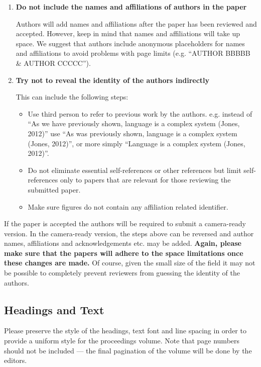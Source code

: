 \documentclass{evolang11}
\begin{document}
\begin{enumerate}
\item  \textbf{Do not include the names and affiliations of authors in the paper}

Authors will add names and affiliations after the paper has been reviewed and accepted.  However, keep in mind that names and affiliations will take up space.  We suggest that authors include anonymous placeholders for names and affiliations to avoid problems with page limits (e.g. ``AUTHOR BBBBB \& AUTHOR CCCCC'').

\item \textbf{Try not to reveal the identity of the authors indirectly}

This can include the following steps:

\begin{itemize}
\item Use third person to refer to previous work by the authors.  e.g. instead of ``As we have previously shown, language is a complex system (Jones, 2012)'' use ``As was previously shown, language is a complex system (Jones, 2012)'', or more simply ``Language is a complex system (Jones, 2012)''.
\item Do not eliminate essential self-references or other references but limit self-references only to papers that are relevant for those reviewing the submitted paper.
\item Make sure figures do not contain any affiliation related identifier.
\end{itemize}

\end{enumerate}

If the paper is accepted the authors will be required to submit a camera-ready version.  In the camera-ready version, the steps above can be reversed and author names, affiliations and acknowledgements etc. may be added.  \textbf{Again, please make sure that the papers will adhere to the space limitations once these changes are made.}  Of course, given the small size of the field it may not be possible to completely prevent reviewers from guessing the identity of the authors.  


\subsection{Headings and Text}

Please preserve the style of the headings, text font and line spacing
in order to provide a uniform style for the proceedings volume.  Note
that page numbers should not be included --- the final pagination of
the volume will be done by the editors.
\end{document}
